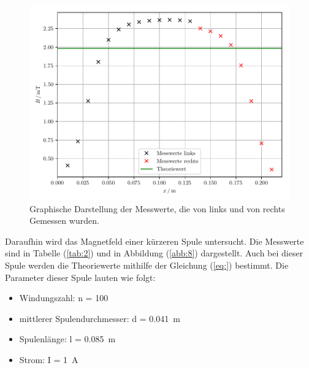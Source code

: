 \begin{figure}[H]
  \centering
  \includegraphics{plot1.pdf}
  \caption{Graphische Darstellung der Messwerte, die von links und von rechts Gemessen wurden.}
  \label{abb:7}
\end{figure}

Daraufhin wird das Magnetfeld einer kürzeren Spule untersucht. Die Messwerte sind in
Tabelle (\ref{tab:2}) und in Abbildung (\ref{abb:8}) dargestellt. Auch bei dieser
Spule werden die Theoriewerte mithilfe der Gleichung (\ref{eq:}) bestimmt. Die
Parameter dieser Spule lauten wie folgt:

\begin{itemize}
  \item Windungszahl: n = 100
  \item mittlerer Spulendurchmesser: d = \SI{0.041}{\meter}
  \item Spulenlänge: l = \SI{0.085}{\meter}
  \item Strom: I = \SI{1}{\ampere}
\end{itemize}

